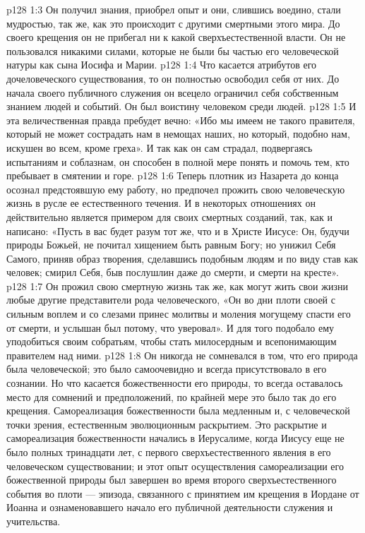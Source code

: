 \vs p128 1:3 Он получил знания, приобрел опыт и они, слившись воедино, стали мудростью, так же, как это происходит с другими смертными этого мира. До своего крещения он не прибегал ни к какой сверхъестественной власти. Он не пользовался никакими силами, которые не были бы частью его человеческой натуры как сына Иосифа и Марии.
\vs p128 1:4 Что касается атрибутов его дочеловеческого существования, то он полностью освободил себя от них. До начала своего публичного служения он всецело ограничил себя собственным знанием людей и событий. Он был воистину человеком среди людей.
\vs p128 1:5 \pc И эта величественная правда пребудет вечно: «Ибо мы имеем не такого правителя, который не может сострадать нам в немощах наших, но который, подобно нам, искушен во всем, кроме греха». И так как он сам страдал, подвергаясь испытаниям и соблазнам, он способен в полной мере понять и помочь тем, кто пребывает в смятении и горе.
\vs p128 1:6 \pc Теперь плотник из Назарета до конца осознал предстоявшую ему работу, но предпочел прожить свою человеческую жизнь в русле ее естественного течения. И в некоторых отношениях он действительно является примером для своих смертных созданий, так, как и написано: «Пусть в вас будет разум тот же, что и в Христе Иисусе: Он, будучи природы Божьей, не почитал хищением быть равным Богу; но унижил Себя Самого, приняв образ творения, сделавшись подобным людям и по виду став как человек; смирил Себя, быв послушлин даже до смерти, и смерти на кресте».
\vs p128 1:7 Он прожил свою смертную жизнь так же, как могут жить свои жизни любые другие представители рода человеческого, «Он во дни плоти своей с сильным воплем и со слезами принес молитвы и моления могущему спасти его от смерти, и услышан был потому, что уверовал». И для того подобало ему  уподобиться своим собратьям, чтобы стать милосердным и всепонимающим правителем над ними.
\vs p128 1:8 Он никогда не сомневался в том, что его природа была человеческой; это было самоочевидно и всегда присутствовало в его сознании. Но что касается божественности его природы, то всегда оставалось место для сомнений и предположений, по крайней мере это было так до его крещения. Самореализация божественности была медленным и, с человеческой точки зрения, естественным эволюционным раскрытием. Это раскрытие и самореализация божественности начались в Иерусалиме, когда Иисусу еще не было полных тринадцати лет, с первого сверхъестественного явления в его человеческом существовании; и этот опыт осуществления самореализации его божественной природы был завершен во время второго сверхъестественного события во плоти --- эпизода, связанного с принятием им крещения в Иордане от Иоанна и ознаменовавшего начало его публичной деятельности служения и учительства.
